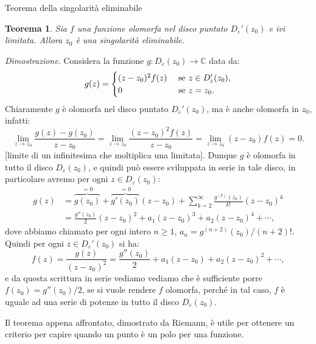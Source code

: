 \documentclass[11pt]{book}
\makeatletter
\theoremstyle{Definizione}
\theoremstyle{TeoremaProposizioneLemmaCorollarioCongettura}
\newtheorem{myteo}{Teorema}[section]
\theoremstyle{OsservazioneNotaEsempio}
\renewenvironment{proof}[1][\proofname]{\par
  \normalfont \topsep6\p@\@plus6\p@\relax
  \trivlist
  \item[\hskip\labelsep
        \itshape
    #1\@addpunct{.}]\ignorespaces
}{%
  \endtrivlist\@endpefalse
}
\renewenvironment{proof}{\textsl{Dimostrazione}.}{}
\newcommand{\C}{\mathbb{C}}
\newcommand{\Disc}[3][]{D^{#1}_{{#2}}({#3})}
\newcommand{\DiscPunt}[2]{D_{#1}'({#2})}
\makeatother
\begin{document}
\begin{boxteo}{Teorema della singolarità eliminabile}
\begin{myteo}\label{teo:TeoremaDellaSingolaritàEliminabile}
Sia $f$ una funzione olomorfa nel disco puntato $\DiscPunt{\varepsilon}{z_0}$ e ivi limitata. Allora $z_0$ è una singolarità eliminabile.
\end{myteo}
\tcblower
\begin{proof}
Considera la funzione $g:\Disc{\varepsilon}{z_0} \longrightarrow \C$ data da:
$$
g(z) = \begin{cases}
(z-z_0)^2f(z) &\textup{ se }z\in \DiscPunt{\varepsilon}{z_0},\\
0 &\textup{ se }z = z_0.
\end{cases}
$$
Chiaramente $g$ è olomorfa nel disco puntato $\DiscPunt{\varepsilon}{z_0}$, ma è anche olomorfa in $z_0$, infatti:
$$
\lim_{z\to z_0} \frac{g(z)-g(z_0)}{z-z_0} = \lim_{z \to z_0} \frac{(z-z_0)^2f(z)}{z-z_0} = \lim_{z \to z_0} (z-z_0) f(z) = 0.
$$
[limite di un infinitesima che moltiplica una limitata]. Dunque $g$ è olomorfa in tutto il disco $\Disc{\varepsilon}{z_0}$, e quindi può essere sviluppata in serie in tale disco, in particolare avremo per ogni $z\in \Disc{\varepsilon}{z_0}$:
\begin{align*}
g(z) &= \overbrace{g(z_0)}^{ = 0} + \overbrace{g'(z_0)}^{ = 0}(z-z_0) + \sum_{k = 2}^\infty \frac{g^{(k)}(z_0)}{k!}(z-z_0)^k\\
&= \frac{g''(z_0)}{2}(z-z_0)^2+ a_1(z-z_0)^3 + a_2 (z-z_0)^4+\cdots,
\end{align*}
dove abbiamo chiamato per ogni intero $n\geq 1$, $a_n = g^{(n+2)}(z_0)/(n+2)!$. Quindi per ogni $z\in \DiscPunt{\varepsilon}{z_0}$ si ha:
$$
f(z) = \frac{g(z)}{(z-z_0)^2} = \frac{g''(z_0)}{2}+a_1(z-z_0)+a_2(z-z_0)^2+\cdots,
$$
e da questa scrittura in serie vediamo  vediamo che è sufficiente porre $f(z_0) = g''(z_0)/2$, se si vuole rendere $f$ olomorfa, perché in tal caso, $f$ è uguale ad una serie di potenze in tutto il disco $\Disc{\varepsilon}{z_0}$.
\end{proof}
\end{boxteo}
\noindent
Il teorema appena affrontato, dimostrato da Riemann, è utile per ottenere un criterio per capire quando un punto è un polo per una funzione.
\end{document}
